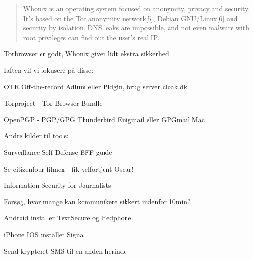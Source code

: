 \documentclass[20pt,landscape,a4paper,footrule]{foils}
\begin{document}
\begin{quote}
Whonix is an operating system focused on anonymity, privacy and security. It's based on the Tor anonymity network[5], Debian GNU/Linux[6] and security by isolation. DNS leaks are impossible, and not even malware with root privileges can find out the user's real IP. 

\end{quote}

\centerline{Torbrowser er godt, Whonix giver lidt ekstra sikkerhed}





Iaften vil vi fokusere på disse:
\begin{list2}
\item OTR Off-the-record Adium eller Pidgin, brug server cloak.dk
\item Torproject - Tor Browser Bundle
\item OpenPGP - PGP/GPG Thunderbird Enigmail eller GPGmail Mac
\end{list2}

Andre kilder til tools:
\begin{list2}
\item Surveillance Self-Defense EFF guide
\item Se citizenfour filmen - fik velfortjent Oscar!\\ {\footnotesize{}}
\item Information Security for Journalists\\
\end{list2}



Forsøg, hvor mange kan kommunikere sikkert indenfor 10min?

\begin{list2}
\item Android installer TextSecure og Redphone
\item iPhone IOS installer Signal
\end{list2}

\vskip 1cm
\centerline{Send krypteret SMS til en anden herinde}
\end{document}
